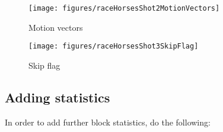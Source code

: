 \documentclass[a4paper,11pt]{jvetdoc}
\begin{document}
\begin{figure}[htpb]
  \centering
  \texttt{[image: figures/raceHorsesShot2MotionVectors]}
  \caption{Motion vectors}
  \label{fig:motion-vectors}
\end{figure}


\begin{figure}[htpb]
  \centering
  \texttt{[image: figures/raceHorsesShot3SkipFlag]}
  \caption{Skip flag}
  \label{fig:skip-flag}
\end{figure}

\subsection{Adding statistics}
\label{sec:adding-statistics}

In order to add further block statistics, do the following:
\end{document}
